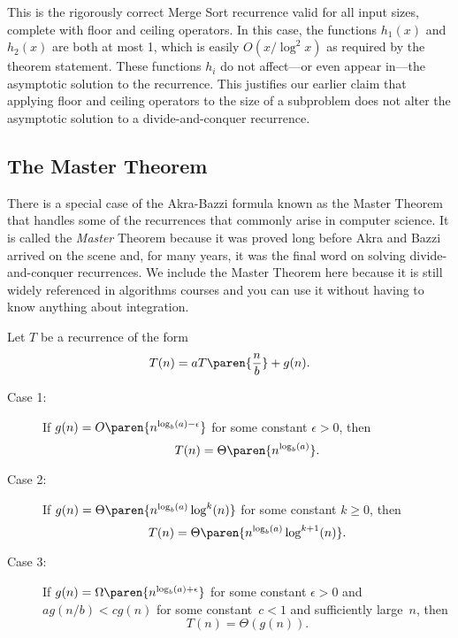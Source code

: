 This is the rigorously correct Merge Sort recurrence valid for all
input sizes, complete with floor and ceiling operators.  In this case,
the functions $h_1(x)$ and $h_2(x)$ are both at most 1, which is
easily $O(x / \log^2 x)$ as required by the theorem statement.  These
functions $h_i$ do not affect---or even appear in---the asymptotic
solution to the recurrence.  This justifies our earlier claim that
applying floor and ceiling operators to the size of a subproblem does
not alter the asymptotic solution to a divide-and-conquer recurrence.

\subsection{The Master Theorem}

There is a special case of the Akra-Bazzi formula known as the Master
Theorem that handles some of the recurrences that commonly arise in
computer science.  It is called the \emph{Master} Theorem because it
was proved long before Akra and Bazzi arrived on the scene and, for
many years, it was the final word on solving divide-and-conquer
recurrences.  We include the Master Theorem here because it is still
widely referenced in algorithms courses and you can use it without
having to know anything about integration.

\begin{theorem}\label{thm:master_theorem}
Let $T$ be a recurrence of the form
\[
   T(n) = a T\paren{\frac{n}{b}} + g(n).
\]
\begin{description}

\item[Case 1:]
If $g(n) = O\paren{n^{\log_b(a) - \epsilon}}$ for some constant
$\epsilon > 0$, then
\[
T(n) = \Theta\paren{n^{\log_b(a)}}.
\]

\item[Case 2:]
If $g(n) = \Theta\paren{n^{\log_b(a)} \log^k(n)}$ for some constant
$k \ge 0$, then
\[
T(n) = \Theta\paren{n^{\log_b(a)} \log^{k + 1}(n)}.
\]

\item[Case 3:]

If $g(n) = \Omega\paren{n^{\log_b(a) + \epsilon}}$ for some constant
$\epsilon > 0$ and $a g(n/b) < c g(n)$ for some constant~$c < 1$ and
sufficiently large~$n$, then
\[
T(n) = \Theta(g(n)).
\]

\end{description}
\end{theorem}

